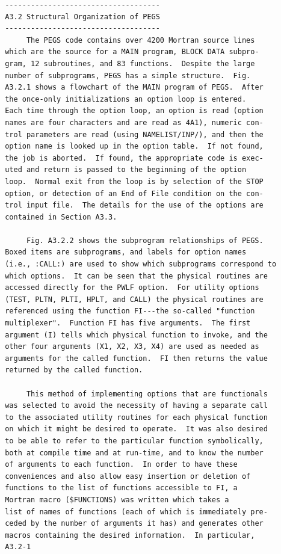 \begin{verbatim}
 ------------------------------------
 A3.2 Structural Organization of PEGS
 ------------------------------------
      The PEGS code contains over 4200 Mortran source lines
 which are the source for a MAIN program, BLOCK DATA subpro-
 gram, 12 subroutines, and 83 functions.  Despite the large
 number of subprograms, PEGS has a simple structure.  Fig.
 A3.2.1 shows a flowchart of the MAIN program of PEGS.  After
 the once-only initializations an option loop is entered.
 Each time through the option loop, an option is read (option
 names are four characters and are read as 4A1), numeric con-
 trol parameters are read (using NAMELIST/INP/), and then the
 option name is looked up in the option table.  If not found,
 the job is aborted.  If found, the appropriate code is exec-
 uted and return is passed to the beginning of the option
 loop.  Normal exit from the loop is by selection of the STOP
 option, or detection of an End of File condition on the con-
 trol input file.  The details for the use of the options are
 contained in Section A3.3.
 
      Fig. A3.2.2 shows the subprogram relationships of PEGS.
 Boxed items are subprograms, and labels for option names
 (i.e., :CALL:) are used to show which subprograms correspond to
 which options.  It can be seen that the physical routines are
 accessed directly for the PWLF option.  For utility options
 (TEST, PLTN, PLTI, HPLT, and CALL) the physical routines are
 referenced using the function FI---the so-called "function
 multiplexer".  Function FI has five arguments.  The first
 argument (I) tells which physical function to invoke, and the
 other four arguments (X1, X2, X3, X4) are used as needed as
 arguments for the called function.  FI then returns the value
 returned by the called function.
 
      This method of implementing options that are functionals
 was selected to avoid the necessity of having a separate call
 to the associated utility routines for each physical function
 on which it might be desired to operate.  It was also desired
 to be able to refer to the particular function symbolically,
 both at compile time and at run-time, and to know the number
 of arguments to each function.  In order to have these
 conveniences and also allow easy insertion or deletion of
 functions to the list of functions accessible to FI, a
 Mortran macro ($FUNCTIONS) was written which takes a
 list of names of functions (each of which is immediately pre-
 ceded by the number of arguments it has) and generates other
 macros containing the desired information.  In particular,
 A3.2-1
\end{verbatim}
